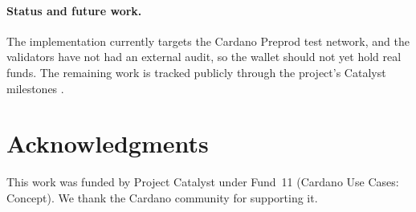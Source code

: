 \documentclass[11pt,DIV=11,parskip=half-]{scrartcl}
\begin{document}
\paragraph{Status and future work.} The implementation currently targets the Cardano Preprod test network, and the validators have not had an external audit, so the wallet should not yet hold real funds. The remaining work is tracked publicly through the project's Catalyst milestones \cite{catalystMilestones}.

\section*{Acknowledgments}
%
This work was funded by Project Catalyst \cite{projectCatalyst} under Fund~11 (Cardano Use Cases: Concept). We thank the Cardano community for supporting it.


{}%

\end{document}
